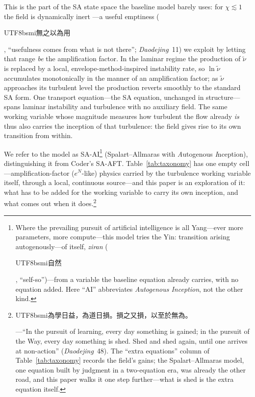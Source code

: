 \documentclass[journal]{new-aiaa}
\begin{document}
This is the part of the SA state space the baseline model barely uses:
for $\chi\!\lesssim\!1$ the field is dynamically
inert \cite{spalart_allmaras_1994}---a useful emptiness
(\begin{CJK}{UTF8}{bsmi}無之以為用\end{CJK}, ``usefulness comes from what is
not there''; \emph{Daodejing}~11) we exploit by
letting that range \emph{be} the
amplification factor. In the laminar regime the production of $\tilde\nu$ is replaced by a local,
envelope-method-inspired instability rate, so $\ln\tilde\nu$ accumulates
monotonically in the manner of an amplification factor; as $\tilde\nu$ approaches its
turbulent level the production reverts smoothly to the standard SA form. One
transport equation---the SA equation, unchanged in structure---spans laminar
instability and turbulence with no auxiliary field. The same working variable
whose magnitude measures how turbulent the flow already \emph{is} thus also
carries the inception of that turbulence: the field gives rise to its own
transition from within.

We refer to the model as SA-AI\footnote{Where the prevailing pursuit of
artificial intelligence is all Yang---ever more parameters, more compute---this
model tries the Yin: transition arising autogenously---of itself,
\emph{ziran} (\begin{CJK}{UTF8}{bsmi}自然\end{CJK}, ``self-so'')---from a
variable the baseline
equation already carries, with no equation added. Here ``AI'' abbreviates
\emph{Autogenous Inception}, not the other kind.} (Spalart--Allmaras with
\emph{A}utogenous \emph{I}nception), distinguishing it from Coder's
SA-AFT. Table~\ref{tab:taxonomy} has one empty
cell---amplification-factor ($e^N$-like) physics carried by the
turbulence working variable itself, through a local, continuous
source---and this paper is an exploration of it: what has to be added
for the working variable to carry its own inception, and what comes
out when it does.\footnote{\begin{CJK}{UTF8}{bsmi}為學日益，為道日損。損之又損，以至於無為。\end{CJK}---``In
the pursuit of learning, every day something is gained; in the pursuit of the
Way, every day something is shed. Shed and shed again, until one arrives at
non-action'' (\emph{Daodejing}~48). The ``extra equations'' column of
Table~\ref{tab:taxonomy} records the field's gains; the Spalart--Allmaras
model, one equation built by judgment in a two-equation era, was already the
other road, and this paper walks it one step further---what is shed is the
extra equation itself.}
\end{document}
